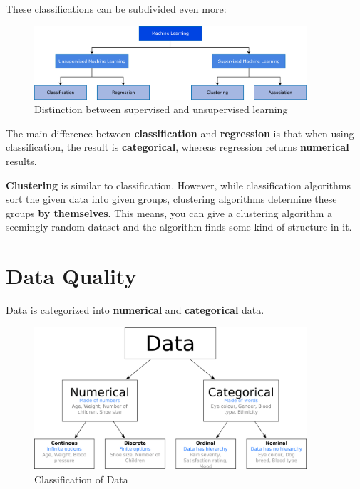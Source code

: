 \documentclass[11pt]{article}
\begin{document}
These classifications can be subdivided even more:

\begin{figure}[htb!]
    \centering
    \includegraphics[keepaspectratio=true, width=0.9\textwidth]{disciplines.png}
    \caption{Distinction between supervised and unsupervised learning}
    \label{fig:class}
\end{figure}

The main difference between \textbf{classification} and \textbf{regression} is that when using classification, the result is \textbf{categorical}, whereas regression returns \textbf{numerical} results.

\textbf{Clustering} is similar to classification. However, while classification algorithms sort the given data into given groups, clustering algorithms determine these groups \textbf{by themselves}. This means, you can give a clustering algorithm a seemingly random dataset and the algorithm finds some kind of structure in it.

\newpage

\section{Data Quality}

Data is categorized into \textbf{numerical} and \textbf{categorical} data.

\begin{figure}[htb!]
    \centering
    \includegraphics[keepaspectratio=true, width=0.9\textwidth]{data_classification.png}
    \caption{Classification of Data}
    \label{fig:data_classification}
\end{figure}
\end{document}
